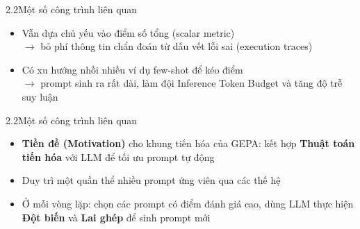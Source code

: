 \begin{frame}{2.2\quad Một số công trình liên quan}
  \vspace{0.3em}
  \begin{itemize}\setlength{\itemsep}{0.7em}
    \item Vẫn dựa chủ yếu vào điểm số tổng (scalar metric)\\
          $\rightarrow$ bỏ phí thông tin chẩn đoán từ dấu vết lỗi sai (execution traces)
    \item Có xu hướng nhồi nhiều ví dụ few-shot để kéo điểm\\
          $\rightarrow$ prompt sinh ra rất dài, làm đội Inference Token Budget và tăng độ
          trễ suy luận
  \end{itemize}
\end{frame}

\begin{frame}{2.2\quad Một số công trình liên quan}
  \vspace{0.4em}
  \begin{itemize}\setlength{\itemsep}{0.6em}
    \item \textbf{Tiền đề (Motivation)} cho khung tiến hóa của GEPA: kết hợp
          \textbf{Thuật toán tiến hóa} với LLM để tối ưu prompt tự động
    \item Duy trì một quần thể nhiều prompt ứng viên qua các thế hệ
    \item Ở mỗi vòng lặp: chọn các prompt có điểm đánh giá cao, dùng LLM thực hiện
          \textbf{Đột biến} và \textbf{Lai ghép} để sinh prompt mới
  \end{itemize}
\end{frame}

